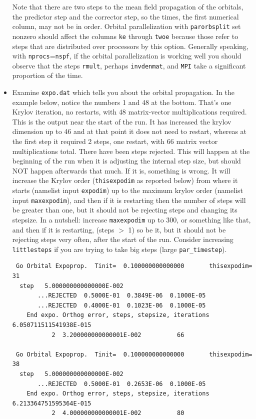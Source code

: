 \documentclass[10pt,leqno, oneside]{book}
\begin{document}
\begin{itemize}
{Note that there are two steps to the mean field propagation of the orbitals, 
the predictor step and the corrector step, 
so the times, the first numerical column, may not be in order.  Orbital parallelization with \verb#parorbsplit# set nonzero should affect the columns
\verb#ke# through \verb#twoe# because those refer to steps that are distributed over processors by this option.  Generally speaking, with \verb#nprocs#=\verb#nspf#,
if the orbital parallelization is working well you should observe that the steps \verb#rmult#, perhaps \verb#invdenmat#, and \verb#MPI# take a significant proportion of the time.
}
\item{Examine \verb#expo.dat# which tells you about the orbital propagation.  
In the example below, notice the numbers 1 and 48 at the bottom.  That's one Krylov iteration, no restarts, with 48 matrix-vector multiplications required.
This is the output near the start of the run.  It has increased the krylov dimension up to 46 and at that point it does not need to restart, whereas
at the first step it required 2 steps, one restart, with 66 matrix vector multiplications total.  There have been steps rejected.  This
will happen at the beginning of the run when it is adjusting the internal step size, but should NOT happen afterwards that much.  If it is, something is wrong.  It will increase
the Krylov order (\verb#thisexpodim# as reported below) from where it starts (namelist input \verb#expodim#) up to
the maximum krylov order (namelist input \verb#maxexpodim#), and then if it is restarting then the number of steps will be greater than one, 
but it should not be rejecting steps and changing its stepsize.  In a nutshell: increase \verb#maxexpodim# up to 300, or something like that, and then if it is restarting, 
(steps $>$ 1) so be it, but it should not be rejecting steps very often, after the start of the run.  Consider increasing \verb#littlesteps# if you are trying to take big steps (large \verb#par_timestep#).
%
{\footnotesize
\begin{verbatim}
 Go Orbital Expoprop.  Tinit=  0.100000000000000       thisexpodim=          31 
  step   5.000000000000000E-002
       ...REJECTED  0.5000E-01  0.3849E-06  0.1000E-05
       ...REJECTED  0.4000E-01  0.1023E-06  0.1000E-05
    End expo. Orthog error, steps, stepsize, iterations  6.050711511541938E-015
           2  3.200000000000001E-002          66
 
 Go Orbital Expoprop.  Tinit=  0.100000000000000       thisexpodim=          38 
  step   5.000000000000000E-002
       ...REJECTED  0.5000E-01  0.2653E-06  0.1000E-05
    End expo. Orthog error, steps, stepsize, iterations  6.213364751595364E-015
           2  4.000000000000001E-002          80
 

\end{verbatim}}}
\end{itemize}
\end{document}
